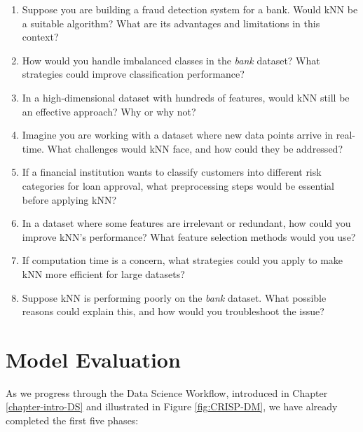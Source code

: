 \documentclass[
]{book}
\providecommand{\tightlist}{%
  \setlength{\itemsep}{0pt}\setlength{\parskip}{0pt}}
\theoremstyle{definition}
\theoremstyle{definition}
\theoremstyle{definition}
\theoremstyle{definition}
\theoremstyle{remark}
\begin{document}
\begin{enumerate}
\def\labelenumi{\arabic{enumi}.}
\setcounter{enumi}{26}
\tightlist
\item
  Suppose you are building a fraud detection system for a bank. Would kNN be a suitable algorithm? What are its advantages and limitations in this context?\\
\item
  How would you handle imbalanced classes in the \emph{bank} dataset? What strategies could improve classification performance?\\
\item
  In a high-dimensional dataset with hundreds of features, would kNN still be an effective approach? Why or why not?\\
\item
  Imagine you are working with a dataset where new data points arrive in real-time. What challenges would kNN face, and how could they be addressed?\\
\item
  If a financial institution wants to classify customers into different risk categories for loan approval, what preprocessing steps would be essential before applying kNN?\\
\item
  In a dataset where some features are irrelevant or redundant, how could you improve kNN's performance? What feature selection methods would you use?\\
\item
  If computation time is a concern, what strategies could you apply to make kNN more efficient for large datasets?\\
\item
  Suppose kNN is performing poorly on the \emph{bank} dataset. What possible reasons could explain this, and how would you troubleshoot the issue?
\end{enumerate}

\chapter{Model Evaluation}\label{chapter-evaluation}

As we progress through the Data Science Workflow, introduced in Chapter \ref{chapter-intro-DS} and illustrated in Figure \ref{fig:CRISP-DM}, we have already completed the first five phases:
\end{document}
